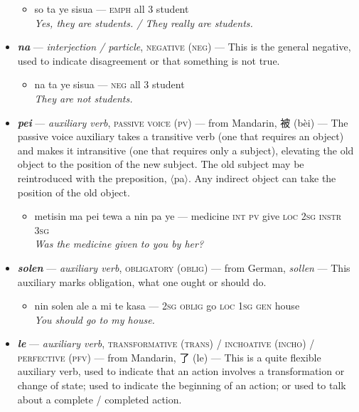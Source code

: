 \documentclass[a4paper, titlepage]{article}
\begin{document}
\begin{itemize}
	\begin{itemize}
		\item so ta ye sisua — \textsc{emph} all 3 student \\\textit{Yes, they are students. / They really are students.}
	\end{itemize}
	\item \textbf{\textit{na}} — \textit{interjection / particle}, \textsc{negative (neg)} — This is the general negative, used to indicate disagreement or that something is not true.
	\begin{itemize}
		\item na ta ye sisua — \textsc{neg} all 3 student \\\textit{They are not students.}
	\end{itemize}
	\item \textbf{\textit{pei}} — \textit{auxiliary verb}, \textsc{passive voice (pv)}  — from Mandarin, 被 (bèi) — The passive voice auxiliary takes a transitive verb (one that requires an object) and makes it intransitive (one that requires only a subject), elevating the old object to the position of the new subject. The old subject may be reintroduced with the preposition, $\langle$pa$\rangle$. Any indirect object can take the position of the old object.
	\begin{itemize}
		\item metisin ma pei tewa a nin pa ye — medicine \textsc{int pv} give \textsc{loc 2sg instr 3sg} \\\textit{Was the medicine given to you by her?}
	\end{itemize}
	\item \textbf{\textit{solen}} — \textit{auxiliary verb}, \textsc{obligatory (oblig)} — from German, \textit{sollen} — This auxiliary marks obligation, what one ought or should do.
	\begin{itemize}
		\item nin solen ale a mi te kasa — \textsc{2sg oblig} go \textsc{loc 1sg gen} house \\\textit{You should go to my house.}
	\end{itemize}
	\item \textbf{\textit{le}} — \textit{auxiliary verb}, \textsc{transformative (trans) / inchoative (incho) / perfective (pfv)} — from Mandarin, 了 (le) — This is a quite flexible auxiliary verb, used to indicate that an action involves a transformation or change of state; used to indicate the beginning of an action; or used to talk about a complete / completed action.
	\begin{itemize}

\end{itemize}
\end{itemize}
\end{document}
